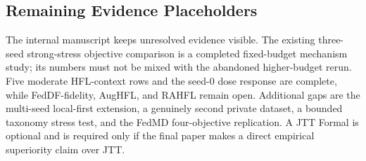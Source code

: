 \subsection{Remaining Evidence Placeholders}

The internal manuscript keeps unresolved evidence visible. The existing three-seed strong-stress objective comparison is a completed fixed-budget mechanism study; its numbers must not be mixed with the abandoned higher-budget rerun. Five moderate HFL-context rows and the seed-0 dose response are complete, while FedDF-fidelity, AugHFL, and RAHFL remain open. Additional gaps are the multi-seed local-first extension, a genuinely second private dataset, a bounded taxonomy stress test, and the FedMD four-objective replication. A JTT Formal is optional and is required only if the final paper makes a direct empirical superiority claim over JTT.


